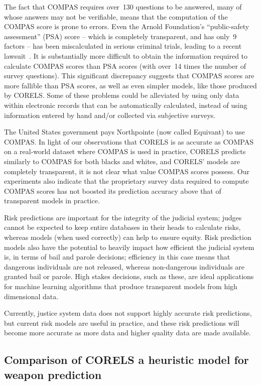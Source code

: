 The fact that COMPAS requires over~130 questions to be answered, many of whose answers may not be verifiable, means that the computation of the COMPAS score is prone to errors.
%
Even the Arnold Foundation's ``public-safety assessment'' (PSA) score -- which is completely transparent, and has only~9 factors -- has been miscalculated in serious criminal trials, leading to a recent lawsuit~\citep{npr-bail:2017}.
%
It is substantially more difficult to obtain the information required to calculate COMPAS scores than PSA scores (with over~14 times the number of survey questions).
%
This significant discrepancy suggests that COMPAS scores are more fallible than PSA scores, as well as even simpler models, like those produced by CORELS.
%
Some of these problems could be alleviated by using only data within electronic records that can be automatically calculated, instead of using information entered by hand and/or collected via subjective surveys.

The United States government pays Northpointe (now called Equivant) to use COMPAS.
%
In light of our observations that CORELS is as accurate as COMPAS on a real-world dataset where COMPAS is used in practice, CORELS predicts similarly to COMPAS for both blacks and whites, and CORELS' models are completely transparent, it is not clear what value COMPAS scores possess.
%
Our experiments also indicate that the proprietary survey data required to compute COMPAS scores has not boosted its prediction accuracy above that of transparent models in practice.

Risk predictions are important for the integrity of the judicial system; judges cannot be expected to keep entire databases in their heads to calculate risks, whereas models (when used correctly) can help to ensure equity.
%
Risk prediction models also have the potential to heavily impact how efficient the judicial system is, in terms of bail and parole decisions; efficiency in this case means that dangerous individuals are not released, whereas non-dangerous individuals are granted bail or parole.
%
High stakes decisions, such as these, are ideal applications for machine learning algorithms that produce transparent models from high dimensional data.

Currently, justice system data does not support highly accurate risk predictions, but current risk models are useful in practice, and these risk predictions will become more accurate as more data and higher quality data are made available.

\subsection{Comparison of CORELS a heuristic model for weapon prediction}
\label{sec:frisk}

